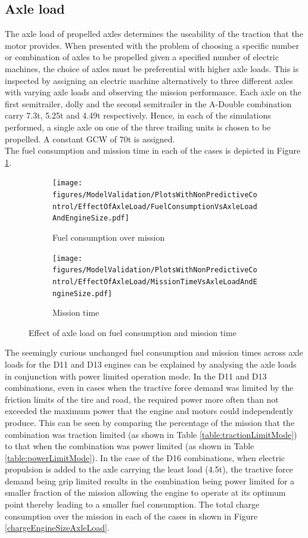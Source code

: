 \documentclass[ExampleMasters.tex]{subfiles}
\begin{document}
\subsection{Axle load}
The axle load of propelled axles determines the useability of the traction that the motor provides. When presented with the problem of choosing a specific number or combination of axles to be propelled given a specified number of electric machines, the choice of axles must be preferential with higher axle loads. This is inspected by assigning an electric machine alternatively to three different axles with varying axle loads and observing the mission performance. Each axle on the first semitrailer, dolly and the second semitrailer in the A-Double combination carry 7.3t, 5.25t and 4.49t respectively. Hence, in each of the simulations performed, a single axle on one of the three trailing units is chosen to be propelled. A constant GCW of 70t is assigned.\\
The fuel consumption and mission time in each of the cases is depicted in Figure \ref{fuelTimeEngineAxleLoad}.
\begin{figure}
\begin{subfigure}{.5\textwidth}
\centering
\texttt{[image: figures/ModelValidation/PlotsWithNonPredictiveControl/EffectOfAxleLoad/FuelConsumptionVsAxleLoadAndEngineSize.pdf]}
\caption{Fuel consumption over mission}
\end{subfigure}
\begin{subfigure}{.5\textwidth}
\centering
\texttt{[image: figures/ModelValidation/PlotsWithNonPredictiveControl/EffectOfAxleLoad/MissionTimeVsAxleLoadAndEngineSize.pdf]}
\caption{Mission time}
\end{subfigure}
\caption{Effect of axle load on fuel consumption and mission time}
\label{fuelTimeEngineAxleLoad}
\end{figure}
The seemingly curious unchanged fuel consumption and mission times across axle loads for the D11 and D13 engines can be explained by analysing the axle loads in conjunction with power limited operation mode. In the D11 and D13 combinations, even in cases when the tractive force demand was limited by the friction limits of the tire and road, the required power more often than not exceeded the maximum power that the engine and motors could independently produce. This can be seen by comparing the percentage of the mission that the combination was traction limited (as shown in Table \ref{table:tractionLimitMode}) to that when the combination was power limited (as shown in Table \ref{table:powerLimitMode}). In the case of the D16 combinations, when electric propulsion is added to the axle carrying the least load (4.5t), the tractive force demand being grip limited results in the combination being power limited for a smaller fraction of the mission allowing the engine to operate at its optimum point thereby leading to a smaller fuel consumption. The total charge consumption over the mission in each of the cases in shown in Figure \ref{chargeEngineSizeAxleLoad}.
\end{document}
